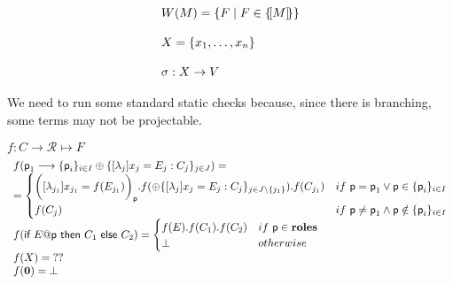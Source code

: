 \begin{displaymath}
  \begin{array}{lll}
    W(M) = \{F \mid F\in\{\![M]\!\}\}
    \\\\
    X = \{x_1,\ldots,x_n\}
    \\\\
    \sigma : X \rightarrow V
  \end{array}
\end{displaymath}



 We need to run some standard
static checks because, since there is branching, some terms may not be
projectable.


$f: C\rightarrow \mathcal R\mapsto F$
\[
\begin{array}{l}
f(\textsf{p}_1\longrightarrow\{\textsf{p}_i\}_{i\in I}\oplus\{[\lambda_j]
x_j=E_j: C_j\}_{j\in J}) = \\
= \begin{cases}
\bigg( [\lambda_{j_1}] x_{j_1} = f(E_{j_1}) \bigg)_{\textsf{p}}. f(\oplus\{[\lambda_j]
x_j=E_j: C_j\}_{j\in J\setminus\{{j_1}\}}). f(C_{j_1}) &if \ \textsf{p} = \textsf{p}_1 \lor \textsf{p} \in \textsf{\{}\textsf{p}_i\}_{i \in I} \\
f(C_j) & if \ \textsf{p} \neq \textsf{p}_1 \land \textsf{p} \notin \{\textsf{p}_i\}_{i\in I}
\end{cases} 
\\
f(\textsf{if } E@\textsf{p} \textsf{ then } C_1 \textsf{ else } C_2) = \begin{cases}
f(E) . f(C_1) . f(C_2) & if\ \textsf{p}\in \mathbf{roles}\\
\bot & otherwise
\end{cases} 
\\
f(X) = \; ??
\\
f(\mathbf{0}) = \bot
\end{array}
\]


